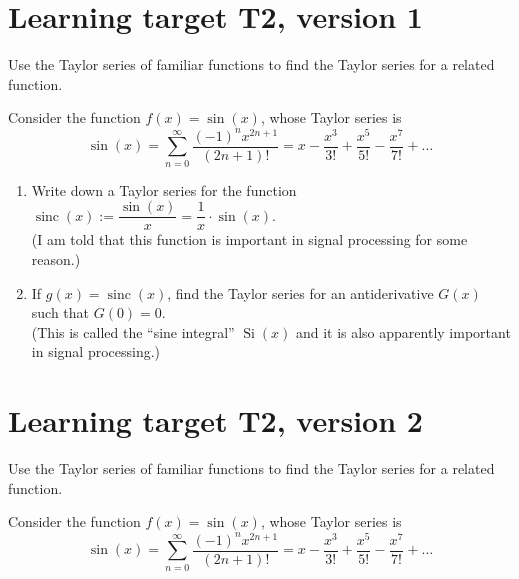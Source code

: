 




\everymath{\displaystyle}

\section{Learning target T2, version 1}

Use the Taylor series of familiar functions to find the Taylor series for a related function.

\hrulefill


\newcommand{\sinc}{\operatorname{sinc}}
Consider the function $f(x) = \sin(x)$, whose Taylor series is 
\[\sin(x) = \sum_{n=0}^\infty \dfrac{(-1)^n x^{2n+1}}{(2n+1)!} = x - \dfrac{x^3}{3!}+\dfrac{x^5}{5!}-\dfrac{x^7}{7!} + \ldots\]

\begin{enumerate}[leftmargin=15pt]
	\item Write down a Taylor series for the function
	\(\sinc(x) := \dfrac{\sin(x)}{x} = \dfrac{1}{x} \cdot \sin(x).\) \\
	(I am told that this function is important in signal processing for some reason.)

	\vfill

	\item If $g(x) = \sinc(x)$, find the Taylor series for an antiderivative $G(x)$ such that $G(0) = 0$.\\
	(This is called the ``sine integral'' $\operatorname{Si}(x)$ and it is also apparently important in signal processing.)

	\vfill

\end{enumerate}

\pagebreak
\section{Learning target T2, version 2}

Use the Taylor series of familiar functions to find the Taylor series for a related function.



\hrulefill

Consider the function $f(x) = \sin(x)$, whose Taylor series is 
\[\sin(x) = \sum_{n=0}^\infty \dfrac{(-1)^n x^{2n+1}}{(2n+1)!} = x - \dfrac{x^3}{3!}+\dfrac{x^5}{5!}-\dfrac{x^7}{7!} + \ldots\]


